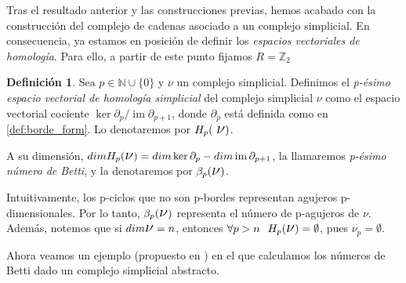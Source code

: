 \documentclass[12pt, a4paper, twoside]{book}
\numberwithin{equation}{section}
\theoremstyle{definition}
\newtheorem{defi}{Definición}[section]
\theoremstyle{remark}
\theoremstyle{plain}
\DeclareMathOperator{\Ima}{im}
\begin{document}
	Tras el resultado anterior y las construcciones previas, hemos acabado
	con la construcción del complejo de cadenas asociado a un complejo 
	simplicial. En consecuencia, ya estamos en posición de definir los
	\emph{espacios vectoriales de homología}. Para ello, a partir de este 
	punto fijamos $R=\mathbb{Z}_{2}$

	\begin{defi}
		\label{defi:homology}
		Sea $p \in \mathbb{N}\cup\{0\}$ y {\Large $\nu$} un complejo 
		simplicial. Definimos el \textit{p-ésimo espacio vectorial de 
		homología simplicial} del complejo simplicial {\Large $\nu$} 
		como el espacio vectorial cociente $\ker \partial_{p}/
		\Ima\partial_{p+1}$, donde $\partial_{p}$ está definida como
		en \ref{def:borde_form}. Lo denotaremos por $H_{p}(\text{
		{\Large $\nu$}})$.

		A su dimensión, $dimH_{p}(\text{{\Large $\nu$}})=
		dim \ker\partial_{p}-dim\Ima\partial_{p+1}$, la 
		llamaremos \textit{p-ésimo número de Betti}, y la denotaremos
		por $\beta_{p}(\text{{\Large $\nu$}})$.
	\end{defi}

	Intuitivamente, los p-ciclos que no son p-bordes representan agujeros
	p-dimensionales. Por lo tanto, $\beta_{p}(\text{{\Large $\nu$}})$ 
	representa el número de p-agujeros de {\Large $\nu$}. Además, notemos 
	que si $dim\text{{\Large $\nu$}}=n$, entonces $\forall p >n 
	\hspace{0.25cm} H_{p}(\text{{\Large $\nu$}})=\emptyset$, pues {\Large 
	$\nu$}$_{p}=\emptyset$.

	Ahora veamos un ejemplo (propuesto en \cite{Intro-Otter}) en el que calculamos 
	los números de Betti dado un complejo simplicial abstracto.
\end{document}

